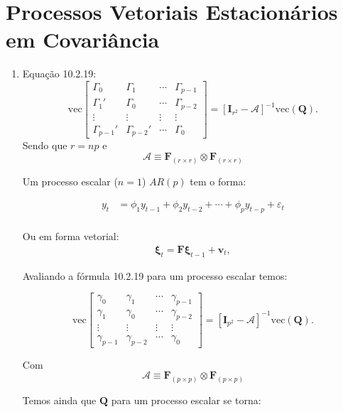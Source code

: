 \setcounter{chapter}{9}
\chapter{Processos Vetoriais Estacionários em Covariância}

\begin{enumerate}
	\item[\fbox{10.1}]
	
	Equação 10.2.19: $$\text{vec}\begin{bmatrix}
	\Gamma_0&\Gamma_1&\cdots&\Gamma_{p-1}\\
	\Gamma_1'&\Gamma_0&\cdots&\Gamma_{p-2}\\
	\vdots&\vdots&\vdots&\vdots\\
	\Gamma_{p-1}'&\Gamma_{p-2}'&\cdots&\Gamma_0
	\end{bmatrix}=[\mathbf{I}_{r^2}-\mathbf{\mathscr{A}}]^{-1}\text{vec}(\mathbf{Q}).$$
	Sendo que $r=np$ e $$\mathbf{\mathscr{A}}\equiv \mathbf{F}_{(r\times r)}\otimes\mathbf{F}_{(r\times r)}$$
	
	
	Um processo escalar ($n=1$) $AR(p)$ tem o forma:
	
	\begin{align*}
		y_t &= \phi_1y_{t-1}+\phi_2y_{t-2}+\cdots+\phi_py_{t-p}+\varepsilon_t\\
	\end{align*}

Ou em forma vetorial:
	\begin{align*}
		\boldsymbol{\xi}_t = \mathbf{F}\boldsymbol{\xi}_{t-1}+\mathbf{v}_t,
	\end{align*}

Avaliando a fórmula 10.2.19 para um processo escalar temos:

	$$\text{vec}\begin{bmatrix}
\gamma_0&\gamma_1&\cdots&\gamma_{p-1}\\
\gamma_1 &\gamma_0&\cdots&\gamma_{p-2}\\
\vdots&\vdots&\vdots&\vdots\\
\gamma_{p-1} &\gamma_{p-2} &\cdots&\gamma_0
\end{bmatrix}=[\mathbf{I}_{p^2}-\mathbf{\mathscr{A}}]^{-1}\text{vec}(\mathbf{Q}).$$

Com $$\mathbf{\mathscr{A}}\equiv \mathbf{F}_{(p\times p)}\otimes\mathbf{F}_{(p\times p)}$$

Temos ainda que $\mathbf{Q}$ para um processo escalar se torna:


\end{enumerate}
